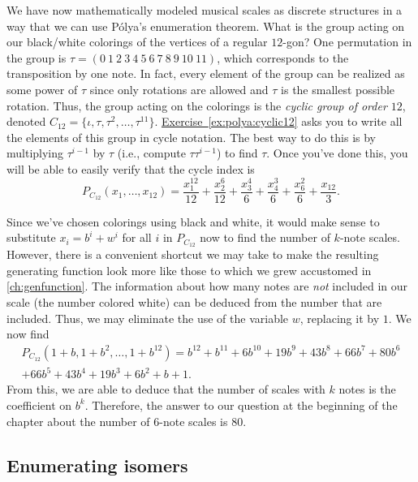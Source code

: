 We have now mathematically modeled musical scales as discrete
structures in a way that we can use P\'olya's enumeration
theorem. What is the group acting on our black/white colorings of the
vertices of a regular $12$-gon? One permutation in the group is $\tau
= (0\ 1\ 2\ 3\ 4\ 5\ 6\ 7\ 8\ 9\ 10\ 11)$, which corresponds to the
transposition by one note. In fact, every element of the group can be
realized as some power of $\tau$ since only rotations are allowed and
$\tau$ is the smallest possible rotation. Thus, the group acting on
the colorings is the \emph{cyclic group of order $12$}, denoted
$C_{12} =
\{\iota,\tau,\tau^2,\dots,\tau^{11}\}$. \hyperref[ex:polya:cyclic12]{Exercise~\ref*{ex:polya:cyclic12}}
asks you to write all the elements of this group in cycle
notation. The best way to do this is by multiplying $\tau^{i-1}$ by
$\tau$ (i.e., compute $\tau\tau^{i-1}$) to find $\tau$. Once you've
done this, you will be able to easily verify that the cycle index is
\[P_{C_{12}}(x_1,\dots,x_{12}) = \frac{x_1^{12}}{12}+\frac{x_2^6}{12}+\frac{x_3^4}{6}+\frac{x_4^3}{6}+\frac{x_6^2}{6}+\frac{x_{12}}{3}.\]

Since we've chosen colorings using black and white, it would make
sense to substitute $x_i = b^i +w^i$ for all $i$ in $P_{C_{12}}$ now
to find the number of $k$-note scales. However, there is a convenient
shortcut we may take to make the resulting generating function look
more like those to which we grew accustomed in
\autoref{ch:genfunction}. The information about how many notes are
\emph{not} included in our scale (the number colored white) can be
deduced from the number that are included. Thus, we may eliminate the
use of the variable $w$, replacing it by $1$. We now find
\begin{multline*}P_{C_{12}}(1+b,1+b^2,\dots,1+b^{12}) = b^{12}+b^{11}+6 b^{10}+19 b^9+43 b^8+66 b^7+80 b^6\\+66 b^5+43 b^4+19 b^3+6 b^2+b+1.\end{multline*}
From this, we are able to deduce that the number of scales with $k$
notes is the coefficient on $b^k$. Therefore, the answer to our
question at the beginning of the chapter about the number of $6$-note
scales is $80$.

\subsection{Enumerating isomers}\label{ss:polya:isomers}

